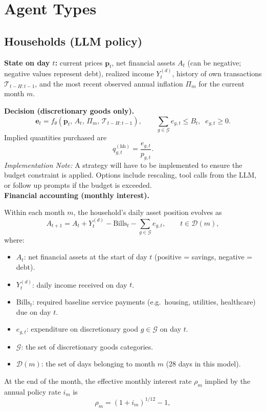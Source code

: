 \documentclass[12pt]{article}
\begin{document}
\section{Agent Types}

\subsection*{Households (LLM policy)}
\textbf{State on day $t$:} current prices $\mathbf{p}_t$, net financial assets $A_t$ (can be negative; negative values represent debt), realized income $Y_t^{(d)}$, history of own transactions $\mathcal{T}_{t-H:t-1}$, and the most recent observed annual inflation $\Pi_m$ for the current month $m$.

\textbf{Decision (discretionary goods only).}  
$$
\mathbf{e}_t = f_{\theta}\!\left(\mathbf{p}_t,\,A_t,\,\Pi_m,\,\mathcal{T}_{t-H:t-1}\right),\qquad
\sum_{g\in\mathcal{G}} e_{g,t}\le B_t,\;\; e_{g,t}\ge 0.
$$
Implied quantities purchased are
$$
q_{g,t}^{(\mathrm{hh})}=\frac{e_{g,t}}{p_{g,t}}.
$$
\emph{Implementation Note:} A strategy will have to be implemented to ensure the budget constraint is applied. Options include rescaling, tool calls from the LLM, or follow up prompts if the budget is exceeded.  \\

\textbf{Financial accounting (monthly interest).}  

Within each month $m$, the household’s daily asset position evolves as
$$
A_{t+1}=A_t + Y_t^{(d)} - \mathrm{Bills}_t - \sum_{g\in\mathcal{G}} e_{g,t}, 
\qquad t\in \mathcal{D}(m),
$$
where:
\begin{itemize}
    \item $A_t$: net financial assets at the start of day $t$ (positive = savings, negative = debt).
    \item $Y_t^{(d)}$: daily income received on day $t$.
    \item $\mathrm{Bills}_t$: required baseline service payments (e.g.\ housing, utilities, healthcare) due on day $t$.
    \item $e_{g,t}$: expenditure on discretionary good $g \in \mathcal{G}$ on day $t$.
    \item $\mathcal{G}$: the set of discretionary goods categories.
    \item $\mathcal{D}(m)$: the set of days belonging to month $m$ (28 days in this model).
\end{itemize}

At the end of the month, the effective monthly interest rate $\rho_m$ implied by the annual policy rate $i_m$ is
$$
\rho_m=(1+i_m)^{1/12}-1,
$$
\end{document}
